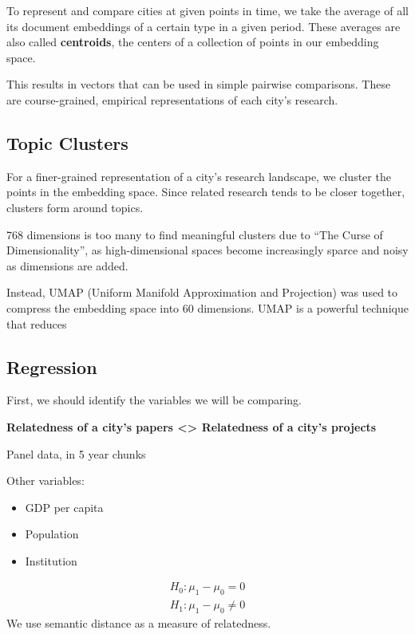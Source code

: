 \documentclass[12pt,a4paper]{article}
\begin{document}
	To represent and compare cities at given points in time, we take the average of all its document embeddings of a certain type in a given period. These averages are also called \textbf{centroids}, the centers of a collection of points in our embedding space.
	
	This results in vectors that can be used in simple pairwise comparisons. These are course-grained, empirical representations of each city's research.
	
	\subsection{Topic Clusters}
	
	For a finer-grained representation of a city's research landscape, we cluster the points in the embedding space. Since related research tends to be closer together, clusters form around topics.
	
	768 dimensions is too many to find meaningful clusters due to ``The Curse of Dimensionality'', as high-dimensional spaces become increasingly sparce and noisy as dimensions are added.
	
	Instead, UMAP (Uniform Manifold Approximation and Projection) was used to compress the embedding space into 60 dimensions. UMAP is a powerful technique that reduces
	
	\subsection{Regression}
	
	First, we should identify the variables we will be comparing.
	
	\textbf{Relatedness of a city's papers \textless{}\textgreater{} Relatedness of a city's projects}
	
	Panel data, in 5 year chunks
	
	Other variables:
	\begin{itemize}
		\item GDP per capita
		\item Population
		\item Institution
	\end{itemize}
	
	\[
	\begin{aligned}
		H_0: \mu_1 -\mu_0 = 0
		\\
		H_1: \mu_1 -\mu_0 \neq 0
	\end{aligned}
	\]
	We use semantic distance as a measure of relatedness.
	
\end{document}
